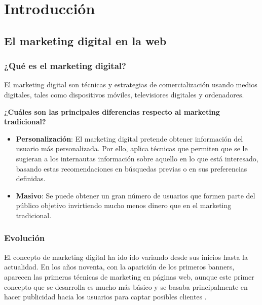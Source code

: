 \chapter{Introducción}


\section{El marketing digital en la web}


\subsection{¿Qué es el marketing digital?}

El marketing digital son técnicas y estrategias de comercialización usando medios digitales, tales como dispositivos móviles, televisiores digitales y ordenadores.

\vspace{5 mm}

\textbf{¿Cuáles son las principales diferencias respecto al marketing tradicional?}

\vspace{5 mm}

\begin{itemize}

\item \textbf{Personalización}: El marketing digital pretende obtener información del usuario más personalizada. Por ello, aplica técnicas que permiten que se le sugieran a los internautas información sobre aquello en lo que está interesado, basando estas recomendaciones en búsquedas previas o en sus preferencias definidas.

\item \textbf{Masivo}: Se puede obtener un gran número de usuarios que formen parte del público objetivo invirtiendo mucho menos dinero que en el marketing tradicional.


\end{itemize}

\subsection{Evolución}

El concepto de marketing digital ha ido ido variando desde sus inicios hasta la actualidad. En los años noventa, con la aparición de los primeros banners, aparecen las primeras técnicas de marketing en páginas web, aunque este primer concepto que se desarrolla es mucho más básico y se basaba principalmente en hacer publicidad hacia los usuarios para captar posibles clientes \cite{marketing-evolution}.

